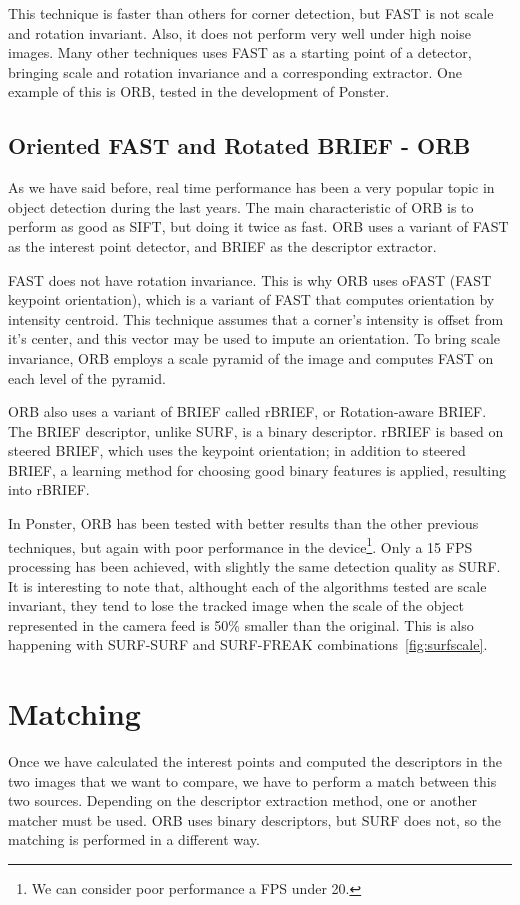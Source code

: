 This technique is faster than others for corner detection, but FAST is not
scale and rotation invariant. Also, it does not perform very well under high
noise images. Many other techniques uses FAST as a starting point of a
detector, bringing scale and rotation invariance and a corresponding
extractor. One example of this is ORB, tested in the development of Ponster.

\subsection{Oriented FAST and Rotated BRIEF - ORB}
As we have said before, real time performance has been a very popular topic in
object detection during the last years. The main characteristic of ORB is to
perform as good as SIFT, but doing it twice as fast. ORB uses a variant of FAST
as the interest point detector, and BRIEF as the descriptor extractor. 

FAST does not have rotation invariance. This is why ORB uses oFAST (FAST
keypoint orientation), which is a variant of FAST that computes orientation by
intensity centroid. This technique assumes that a corner's intensity is offset
from it's center, and this vector may be used to impute an
orientation\cite{6126544}. To bring scale invariance, ORB employs a scale pyramid of the image
and computes FAST on each level of the pyramid.

ORB also uses a variant of BRIEF called rBRIEF, or Rotation-aware BRIEF. The
BRIEF descriptor, unlike SURF, is a binary descriptor. rBRIEF is based on
steered BRIEF, which uses the keypoint orientation; in addition to steered
BRIEF, a learning method for choosing good binary features is applied,
resulting into rBRIEF.

In Ponster, ORB has been tested with better results than the other previous
techniques, but again with poor performance in the device\footnote{We can
  consider poor performance a FPS under 20.}. Only a 15 FPS
processing has been achieved, with slightly the same detection quality as
SURF. It is interesting to note that, althought each of the algorithms tested
are scale invariant, they tend to lose the tracked image when the scale of the object
represented in the camera feed is 50\% smaller than the original. This is also
happening with SURF-SURF and SURF-FREAK combinations~\ref{fig:surfscale}.

\section{Matching}
Once we have calculated the interest points and computed the descriptors in the
two images that we want to compare, we have to perform a match between this two
sources. Depending on the descriptor extraction method, one or another matcher
must be used. ORB uses binary descriptors, but SURF does not, so the matching
is performed in a different way.

